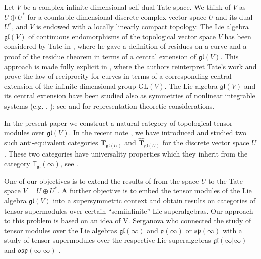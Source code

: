 \documentclass[12pt,reqno]{amsart}
\theoremstyle{definition}
\theoremstyle{remark}
\begin{document}
Let $V$ be a complex infinite-dimensional self-dual Tate space. We think of $V$ as $U\oplus U^\ast$ for a countable-dimensional discrete complex vector space $U$ and its dual $U^\ast$, and $V$ is endowed with a locally linearly compact topology.
The Lie algebra $\mathfrak{gl}(V)$ of continuous endomorphisms of the topological vector space $V$ has been considered by Tate in \cite{T}, where he gave a definition of residues on a curve and a proof of the residue theorem in terms of a central extension of $\mathfrak{gl}(V)$. This approach is made fully explicit in \cite{ADCK}, where the authors reinterpret Tate's work and prove the law of reciprocity for curves in terms of a corresponding central extension of the infinite-dimensional group $\mathrm{GL}(V)$.
The Lie algebra $\mathfrak{gl}(V)$ and its central extension have been studied also as symmetries of nonlinear integrable systems (e.g. \cite{DJM}, \cite{DJKM}); see \cite{FKRW} and \cite{KR} for representation-theoretic considerations.

In the present paper we construct a natural category of topological tensor modules over $\mathfrak{gl}(V)$.
In the recent note \cite{EP}, we have introduced and studied two such anti-equivalent categories $\mathbf{T}_{\mathfrak{gl}(U)}$ and $\widehat{\mathbf{T}}_{\mathfrak{gl}(U)}$ for the discrete vector space $U$. These two categories have universality properties which they inherit from the category $\mathbb{T}_{\mathfrak{gl}}(\infty)$, see \cite{EP}.

One of our objectives is to extend the results of \cite{EP} from the space $U$ to the Tate space $V = U\oplus U^\ast$.
A further objective is to embed the tensor modules of the Lie algebra $\mathfrak{gl}(V)$ into a supersymmetric context and obtain results on categories of tensor supermodules over certain ``semiinfinite'' Lie superalgebras.
Our approach to this problem is based on an idea of V. Serganova who connected the study of tensor modules over the Lie algebras 
$\mathfrak{gl}(\infty)$ and $\mathfrak{o}(\infty)$ or 
$\mathfrak{sp}(\infty)$ with a study of tensor supermodules over the respective Lie superalgebras $\mathfrak{gl}(\infty|\infty)$ and 
$\mathfrak{osp}(\infty|\infty)$ \cite{S}.
\end{document}
